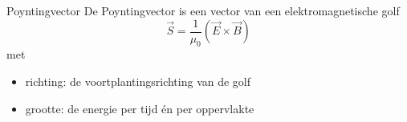 \begin{theo}[Poyntingvector]{Poyntingvector}
    De Poyntingvector is een vector van een elektromagnetische golf 
    \begin{equation*}
        \Vec{S} = \frac{1}{\mu_0}\left(\Vec{E} \times \Vec{B}\right)
    \end{equation*}
    met
    \begin{itemize}
        \item richting: de voortplantingsrichting van de golf
        \item grootte: de energie per tijd én per oppervlakte
    \end{itemize}
\end{theo}
